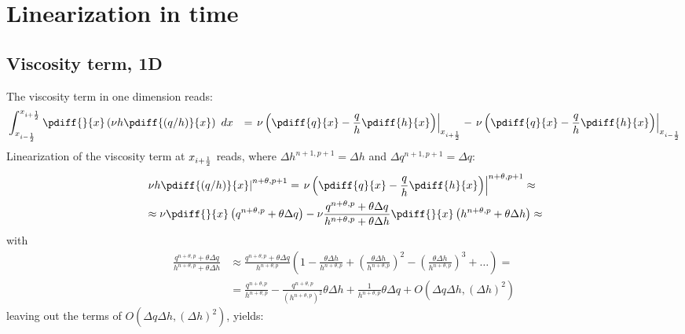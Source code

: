 \chapter{Linearization in time}
\section{Viscosity term, 1D}\label{sec:linearisation_viscosity}
The viscosity term in one dimension reads:
\begin{align}
    &  \int^{x_{i+\half}}_{x_{i-\half}}\pdiff{}{x} \left( \nu h \pdiff{(q/h)}{x} \right)\ dx & =
    \left. \nu \left( \pdiff{q}{x} - \frac{q}{h} \pdiff{h}{x} \right) \right|_{x_{i+\half}} - \left. \nu \left( \pdiff{q}{x} - \frac{q}{h} \pdiff{h}{x} \right) \right|_{x_{i-\half}}
\end{align}
Linearization of the viscosity term at $x_{i+\frac{1}{2}}$ reads, where $\Delta h^{n+1, p+1} = \Delta h$ and  $\Delta q^{n+1, p+1} = \Delta q$:
\begin{align}
    &\left. \nu h \pdiff{(q/h)}{x} \right|^{n+\theta, p+1}  = \left. \nu \left(\pdiff{q}{x} - \frac{q}{h} \pdiff{h}{x} \right) \right|^{n+\theta, p+1} \approx
    \\
    & \approx \nu \pdiff{}{x} \left( q^{n+\theta, p} + \theta \Delta q \right)
    - \nu \frac{q^{n+\theta, p} + \theta \Delta q}{h^{n+\theta, p} + \theta \Delta h} \pdiff{}{x} \left( h^{n+\theta, p} + \theta \Delta h  \right) \approx
\end{align}
with
\begin{align}
    \frac{q^{n+\theta, p} + \theta \Delta q}{h^{n+\theta, p} + \theta \Delta h}
    & \approx \frac{q^{n+\theta, p} + \theta \Delta q}{h^{n+\theta, p}}\left( 1 - \frac{\theta\Delta h}{h^{n+\theta, p}} +
    \left( \frac{\theta\Delta h}{h^{n+\theta, p}}  \right)^2 - \left( \frac{\theta\Delta h}{h^{n+\theta, p}}  \right)^3 + \ldots \right) =
    \\
    & =
    \frac{q^{n+\theta, p}}{h^{n+\theta, p}} - \frac{q^{n+\theta, p}}{(h^{n+\theta, p})^2}\theta\Delta h + \frac{1}{h^{n+\theta, p}}\theta \Delta q  + O\left( \Delta q\Delta h, \left(\Delta h\right)^2 \right)
\end{align}
leaving out the terms of $O\left( \Delta q\Delta h, \left(\Delta h\right)^2 \right)$, yields:
